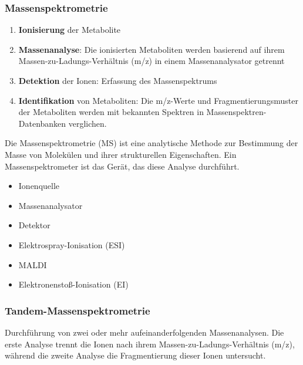 \subsubsection{Massenspektrometrie}
\begin{enumerate} 
    \item \textbf{Ionisierung} der Metabolite
    \item \textbf{Massenanalyse}: Die ionisierten Metaboliten werden basierend auf ihrem Massen-zu-Ladungs-Verhältnis (m/z) in einem Massenanalysator getrennt 
    \item \textbf{Detektion} der Ionen: Erfassung des Massenspektrums
    \item \textbf{Identifikation} von Metaboliten: Die m/z-Werte und Fragmentierungsmuster der Metaboliten werden mit bekannten Spektren in Massenspektren-Datenbanken verglichen.
\end{enumerate}
\begin{mechanism}[title=Was ist ein Massenspektrometer/Massenspektrometrie?]
Die Massenspektrometrie (MS) ist eine analytische Methode zur Bestimmung der Masse von Molekülen und ihrer strukturellen Eigenschaften. Ein Massenspektrometer ist das Gerät, das diese Analyse durchführt.
\end{mechanism}

\begin{mechanism}[title=Bestandteile des Massenspektrometers]
\begin{itemize}
    \item Ionenquelle
    \item Massenanalysator
    \item Detektor
\end{itemize}
\end{mechanism}
\begin{mechanism}[title=Nennen Sie drei verschiedene Ionisierungsmethoden]
\begin{itemize}
    \item Elektrospray-Ionisation (ESI) 
    \item MALDI
    \item Elektronenstoß-Ionisation (EI)
\end{itemize}
\end{mechanism}


\subsubsection{Tandem-Massenspektrometrie}
Durchführung von zwei oder mehr aufeinanderfolgenden Massenanalysen. Die erste Analyse trennt die Ionen nach ihrem Massen-zu-Ladungs-Verhältnis (m/z), während die zweite Analyse die Fragmentierung dieser Ionen untersucht.


